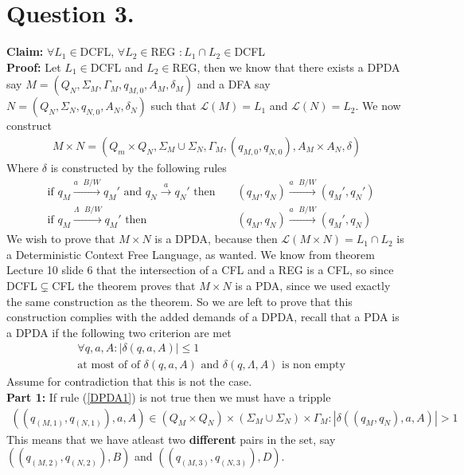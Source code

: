 \documentclass{article}
\theoremstyle{remark}
\numberwithin{equation}{section}
\begin{document}
\section*{Question 3.}
\textbf{Claim:} $\forall L_1\in$DCFL, $\forall L_2\in$REG $:L_1\cap L_2 \in$DCFL\\
\textbf{Proof:} Let $L_1\in$DCFL and $L_2\in$REG, then we know that there exists a DPDA say $M=(Q_N,\Sigma_M,\Gamma_M,q_{M,0},A_M,\delta_M)$ and a DFA say $N=(Q_N,\Sigma_N,q_{N,0},A_N,\delta_N)$ such that $\mathcal{L}(M)=L_1$ and $\mathcal{L}(N)=L_2$. We now construct
\begin{align*}
	M\times N = (Q_m\times Q_N,\Sigma_M\cup\Sigma_N,\Gamma_M,(q_{M,0},q_{N,0}),A_M\times A_N,\delta)
\end{align*}
Where $\delta$ is constructed by the following rules
\begin{align}
	&\text{if } q_M \xrightarrow{a\text{ }B/W} q_M' \text{ and } q_N \xrightarrow{a} q_N' \text{ then }&& (q_M,q_N)\xrightarrow{a\text{ }B/W}(q_M',q_N') \label{const1}\\
	&\text{if } q_M \xrightarrow{\Lambda\text{ }B/W} q_M' \text{ then }&& (q_M,q_N)\xrightarrow{a\text{ }B/W}(q_M',q_N) \label{const2}
\end{align}
We wish to prove that $M\times N$ is a DPDA, because then $\mathcal{L}(M\times N) = L_1\cap L_2$ is a Deterministic Context Free Language, as wanted. We know from theorem Lecture 10 slide 6 that the intersection of a CFL and a REG is a CFL, so since DCFL$\subsetneq$CFL the theorem proves that $M\times N$ is a PDA, since we used exactly the same construction as the theorem. So we are left to prove that this construction complies with the added demands of a DPDA, recall that a PDA is a DPDA if the following two criterion are met
\begin{align}
	&\forall q,a,A: |\delta(q,a,A)|\leq 1 \label{DPDA1}\\
	&\text{at most of of }\delta(q,a,A)\text{ and }\delta(q,\Lambda,A)\text{ is non empty} \label{DPDA2}
\end{align}
Assume for contradiction that this is not the case.\\
\textbf{Part 1:} If rule (\ref{DPDA1}) is not true then we must have a tripple
\begin{align*}
	((q_{(M,1)},q_{(N,1)}),a,A) \in (Q_M\times Q_N)\times(\Sigma_M\cup\Sigma_N)\times\Gamma_M:|\delta((q_M,q_N),a,A)|>1
\end{align*}
This means that we have atleast two \textbf{different} pairs in the set, say $((q_{(M,2)},q_{(N,2)}),B)$ and $((q_{(M,3)},q_{(N,3)}),D)$.\\
\end{document}
